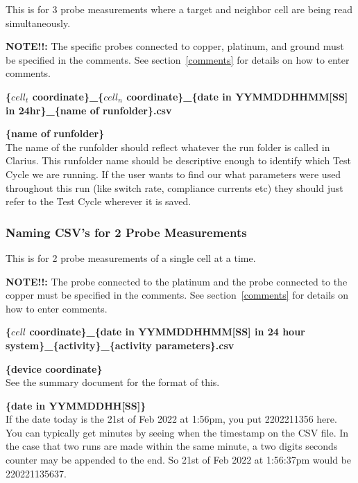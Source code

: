 \documentclass{article}
\begin{document}
          This is for 3 probe measurements where a target and neighbor cell are being read simultaneously.

          \textbf{NOTE!!: } The specific probes connected to copper, platinum, and ground must be specified in the
          comments. See section~\ref{comments} for details on how to enter comments. \\

          \centerline{\textbf{\{$cell_t$ coordinate\}\_\{$cell_n$ coordinate\}\_\{date in YYMMDDHHMM[SS] in
            24hr\}\_\{name of runfolder\}.csv}}

          \textbf{\{name of runfolder\}} \\
          The name of the runfolder should reflect whatever the run folder is called in Clarius. This runfolder name
          should be descriptive enough to identify which Test Cycle we are running. If the user wants to find our what
          parameters were used throughout this run (like switch rate, compliance currents etc) they should just refer to
          the Test Cycle wherever it is saved.

        \subsubsection{Naming CSV's for 2 Probe Measurements}

          This is for 2 probe measurements of a single cell at a time.

          \textbf{NOTE!!: } The probe connected to the platinum and the probe connected to the copper must be specified
          in the comments. See section~\ref{comments} for details on how to enter comments. \\

          \centerline{\textbf{\{$cell$ coordinate\}\_\{date in YYMMDDHHMM[SS] in 24 hour
            system\}\_\{activity\}\_\{activity parameters\}.csv}}
          
          \textbf{\{device coordinate\}} \\
          See the summary document for the format of this.

          \textbf{\{date in YYMMDDHH[SS]\}} \\
          If the date today is the 21st of Feb 2022 at 1:56pm, you put 2202211356 here. You can typically get minutes by
          seeing when the timestamp on the CSV file. In the case that two runs are made within the same minute, a two
          digits seconds counter may be appended to the end. So 21st of Feb 2022 at 1:56:37pm would be 220221135637.
\end{document}
